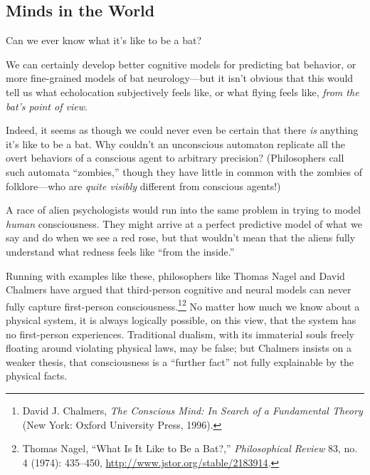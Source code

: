 \subsection{Minds in the World}

{
 Can we ever know what it's like to be a bat?}

{
 We can certainly develop better cognitive models for predicting
bat behavior, or more fine-grained models of bat neurology---but it
isn't obvious that this would tell us what echolocation
subjectively feels like, or what flying feels like, \textit{from the
bat's point of view}.}

{
 Indeed, it seems as though we could never even be certain that
there \textit{is} anything it's like to be a bat. Why
couldn't an unconscious automaton replicate all the
overt behaviors of a conscious agent to arbitrary precision?
(Philosophers call such automata
``zombies,'' though they have little
in common with the zombies of folklore---who are \textit{quite visibly}
different from conscious agents!)}

{
 A race of alien psychologists would run into the same problem in
trying to model \textit{human} consciousness. They might arrive at a
perfect predictive model of what we say and do when we see a red rose,
but that wouldn't mean that the aliens fully understand
what redness feels like ``from the
inside.''}

{
 Running with examples like these, philosophers like Thomas Nagel
and David Chalmers have argued that third-person cognitive and neural
models can never fully capture first-person
consciousness.\footnote{David J. Chalmers, \textit{The Conscious Mind: In Search of a
Fundamental Theory} (New York: Oxford University Press, 1996).}\supercomma\footnote{Thomas Nagel, ``What Is It Like to Be a
Bat?,'' \textit{Philosophical Review} 83, no. 4
(1974): 435--450, \url{http://www.jstor.org/stable/2183914}.} No matter how much we know about a
physical system, it is always logically possible, on this view, that
the system has no first-person experiences. Traditional dualism, with
its immaterial souls freely floating around violating physical laws,
may be false; but Chalmers insists on a weaker thesis, that
consciousness is a ``further fact''
not fully explainable by the physical facts.}

